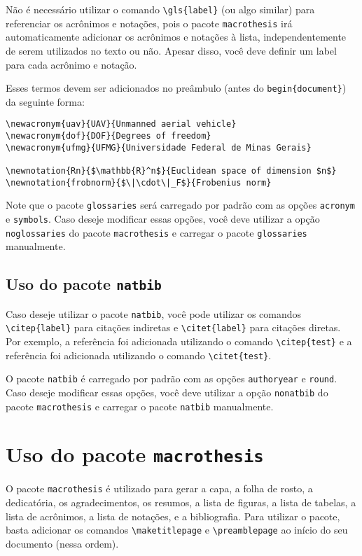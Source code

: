 \documentclass{macrothesis}
\begin{document}
Não é necessário utilizar o comando \texttt{\textbackslash gls\{label\}} (ou algo similar) para referenciar os acrônimos e notações, pois o pacote \texttt{macrothesis} irá automaticamente adicionar os acrônimos e notações à lista, independentemente de serem utilizados no texto ou não. Apesar disso, você deve definir um label para cada acrônimo e notação.

Esses termos devem ser adicionados no preâmbulo (antes do \verb|begin{document}|) da seguinte forma:
\begin{verbatim}
\newacronym{uav}{UAV}{Unmanned aerial vehicle}
\newacronym{dof}{DOF}{Degrees of freedom}
\newacronym{ufmg}{UFMG}{Universidade Federal de Minas Gerais}

\newnotation{Rn}{$\mathbb{R}^n$}{Euclidean space of dimension $n$}
\newnotation{frobnorm}{$\|\cdot\|_F$}{Frobenius norm}
\end{verbatim}

Note que o pacote \texttt{glossaries} será carregado por padrão com as opções \texttt{acronym} e \texttt{symbols}. Caso deseje modificar essas opções, você deve utilizar a opção \texttt{noglossaries} do pacote \texttt{macrothesis} e carregar o pacote \texttt{glossaries} manualmente.

\subsection{Uso do pacote \texttt{natbib}}
Caso deseje utilizar o pacote \texttt{natbib}, você pode utilizar os comandos \texttt{\textbackslash citep\{label\}} para citações indiretas
e \texttt{\textbackslash citet\{label\}} para citações diretas. Por exemplo, a referência \citep{Gallier2020} foi adicionada utilizando o comando \texttt{\textbackslash citep\{test\}} e a referência \citet{Lee2012} foi adicionada utilizando o comando \texttt{\textbackslash citet\{test\}}.

O pacote \texttt{natbib} é carregado por padrão com as opções \texttt{authoryear} e \texttt{round}. Caso deseje modificar essas opções, você deve utilizar a opção \texttt{nonatbib} do pacote \texttt{macrothesis} e carregar o pacote \texttt{natbib} manualmente.

\section{Uso do pacote \texttt{macrothesis}}
O pacote \texttt{macrothesis} é utilizado para gerar a capa, a folha de rosto, a dedicatória, os agradecimentos, os resumos, a lista de figuras, a lista de tabelas, a lista de acrônimos, a lista de notações, e a bibliografia. Para utilizar o pacote, basta adicionar os comandos \texttt{\textbackslash maketitlepage} e \texttt{\textbackslash preamblepage} ao início do seu documento (nessa ordem).
\end{document}
